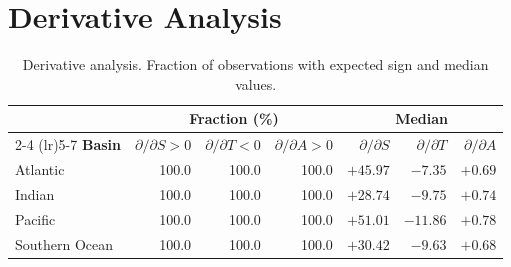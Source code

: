 \documentclass[12pt,a4paper]{article}
\begin{document}
\section{Derivative Analysis}

\begin{table}[htbp]
\centering
\caption{Derivative analysis. Fraction of observations with expected sign and median values.}
\begin{tabular}{l rrr rrr}
\toprule
 & \multicolumn{3}{c}{\textbf{Fraction (\%)}} & \multicolumn{3}{c}{\textbf{Median}} \\
\cmidrule(lr){2-4} \cmidrule(lr){5-7}
\textbf{Basin} & $\partial/\partial S > 0$ & $\partial/\partial T < 0$ & $\partial/\partial A > 0$ & $\partial/\partial S$ & $\partial/\partial T$ & $\partial/\partial A$ \\
\midrule
Atlantic        & 100.0 & 100.0 & 100.0 & $+45.97$ & $-7.35$ & $+0.69$ \\
Indian          & 100.0 & 100.0 & 100.0 & $+28.74$ & $-9.75$ & $+0.74$ \\
Pacific         & 100.0 & 100.0 & 100.0 & $+51.01$ & $-11.86$ & $+0.78$ \\
Southern Ocean  & 100.0 & 100.0 & 100.0 & $+30.42$ & $-9.63$ & $+0.68$ \\
\bottomrule
\end{tabular}
\end{table}
\end{document}
